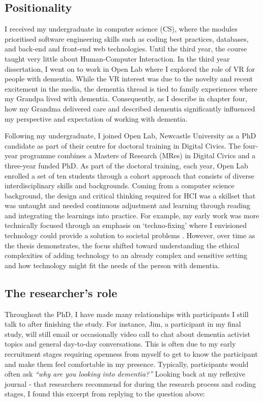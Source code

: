 \subsection{Positionality}
\label{Method:Positionality}
I received my undergraduate in computer science (CS), where the modules prioritised software engineering skills such as coding best practices, databases, and back-end and front-end web technologies. Until the third year, the course taught very little about Human-Computer Interaction. In the third year dissertation, I went on to work in Open Lab where I explored the role of VR for people with dementia. While the VR interest was due to the novelty and recent excitement in the media, the dementia thread is tied to family experiences where my Grandpa lived with dementia. Consequently, as I describe in chapter four, how my Grandma delivered care and described dementia significantly influenced my perspective and expectation of working with dementia. 

Following my undergraduate, I joined Open Lab, Newcastle University as a PhD candidate as part of their centre for doctoral training in Digital Civics. The four-year programme combines a Masters of Research (MRes) in Digital Civics and a three-year funded PhD. As part of the doctoral training, each year, Open Lab enrolled a set of ten students through a cohort approach that consists of diverse interdisciplinary skills and backgrounds. Coming from a computer science background, the design and critical thinking required for HCI was a skillset that was untaught and needed continuous adjustment and learning through reading and integrating the learnings into practice. For example, my early work was more technically focused through an emphasis on `techno-fixing' where I envisioned technology could provide a solution to societal problems \citep{jongsma2017usual}. However, over time as the thesis demonstrates, the focus shifted toward understanding the ethical complexities of adding technology to an already complex and sensitive setting and how technology might fit the needs of the person with dementia.

\subsection{The researcher's role}
\label{Reflexivity:Questions}
Throughout the PhD, I have made many relationships with participants I still talk to after finishing the study. For instance, Jim, a participant in my final study, will still email or occasionally video call to chat about dementia activist topics and general day-to-day conversations. This is often due to my early recruitment stages requiring openness from myself to get to know the participant and make them feel comfortable in my presence. Typically, participants would often ask \textit{``why are you looking into dementia?''} Looking back at my reflexive journal - that researchers recommend for during the research process and coding stages, I found this excerpt from  replying to the question above:

